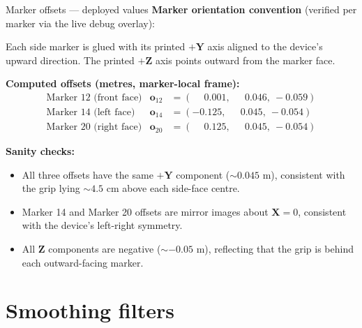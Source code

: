 \documentclass[10pt,aspectratio=169]{beamer}
\begin{document}
\begin{frame}{Marker offsets --- deployed values}
\textbf{Marker orientation convention} (verified per marker via the live debug overlay):

Each side marker is glued with its printed $+\mathbf{Y}$ axis aligned to the device's upward direction. The printed $+\mathbf{Z}$ axis points outward from the marker face.

\textbf{Computed offsets (metres, marker-local frame):}
\[
\begin{array}{lll}
\text{Marker 12 (front face)} & \mathbf{o}_{12} & = (\phantom{-}0.001,\ \phantom{-}0.046,\ -0.059) \\
\text{Marker 14 (left face)}  & \mathbf{o}_{14} & = (-0.125,\ \phantom{-}0.045,\ -0.054) \\
\text{Marker 20 (right face)} & \mathbf{o}_{20} & = (\phantom{-}0.125,\ \phantom{-}0.045,\ -0.054)
\end{array}
\]

\textbf{Sanity checks:}
\begin{itemize}
    \item All three offsets have the same $+\mathbf{Y}$ component ($\sim 0.045$ m), consistent with the grip lying $\sim 4.5$ cm above each side-face centre.
    \item Marker 14 and Marker 20 offsets are mirror images about $\mathbf{X} = 0$, consistent with the device's left-right symmetry.
    \item All $\mathbf{Z}$ components are negative ($\sim -0.05$ m), reflecting that the grip is behind each outward-facing marker.
\end{itemize}
\end{frame}

\section{Smoothing filters}
\end{document}
